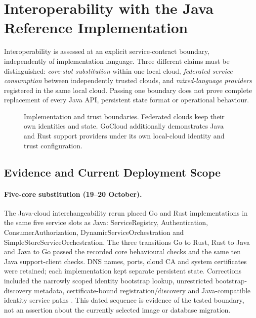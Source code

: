 \documentclass[a4paper]{arrowhead}
\begin{document}
\newpage

\FloatBarrier
\section{Interoperability with the Java Reference Implementation}
\label{sec:interop}
Interoperability is assessed at an explicit service-contract boundary, independently
of implementation language. Three different claims must be distinguished:
\emph{core-slot substitution} within one local cloud, \emph{federated service
consumption} between independently trusted clouds, and \emph{mixed-language
providers} registered in the same local cloud. Passing one boundary does not prove
complete replacement of every Java API, persistent state format or operational behaviour.

\begin{figure}[htbp]
\centering

\caption{Implementation and trust boundaries. Federated clouds keep their own
identities and state. GoCloud additionally demonstrates Java and Rust support
providers under its own local-cloud identity and trust configuration.}
\label{fig:implementation-interop}
\end{figure}
\FloatBarrier

\subsection{Evidence and Current Deployment Scope}
\paragraph{Five-core substitution (19--20 October).}
The Java-cloud interchangeability rerun placed Go and Rust implementations in the
same five service slots as Java: ServiceRegistry, Authentication,
ConsumerAuthorization, DynamicServiceOrchestration and SimpleStoreServiceOrchestration.
The three transitions Go to Rust, Rust to Java and Java to Go passed the recorded
core behavioural checks and the same ten Java support-client checks. DNS names,
ports, cloud CA and system certificates were retained; each implementation kept
separate persistent state. Corrections included the narrowly scoped identity
bootstrap lookup, unrestricted bootstrap-discovery metadata, certificate-bound
registration/discovery and Java-compatible identity service paths
\cite{coreSwaps20261020}. This dated sequence is evidence of the tested boundary,
not an assertion about the currently selected image or database migration.
\end{document}
